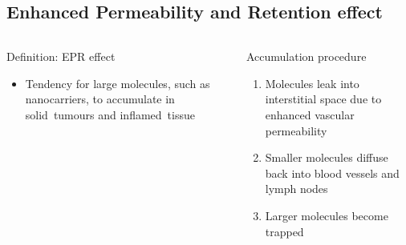 \documentclass[aspectratio=169,compress]{beamer}
\begin{document}
\subsection{\textbf{E}nhanced \textbf{P}ermeability and \textbf{R}etention effect}
\begin{frame}{\subsecname}
  \begin{columns}
      \begin{block}{Definition: EPR effect}
        \begin{itemize}
          \item Tendency for large molecules, such as nanocarriers, to accumulate in \alert{solid~tumours} and \alert{inflamed~tissue}
        \end{itemize}
      \end{block}

      \begin{block}{Accumulation procedure}
        \begin{enumerate}
          \item Molecules leak into interstitial space due to \alert{enhanced vascular permeability}
          \item Smaller molecules diffuse back into blood vessels and lymph nodes
          \item Larger molecules become trapped
        \end{enumerate}
      \end{block}

  \end{columns}
\end{frame}
\end{document}
